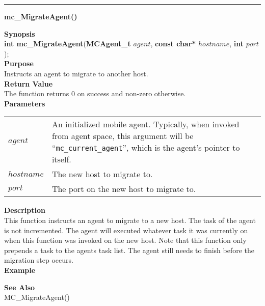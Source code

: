 \noindent
\vspace{5pt}
\rule{6.5in}{0.015in}
\noindent
{}
{\LARGE \bf mc\_MigrateAgent()}\\
\label{api:mc_MigrateAgent()}

\noindent
{\bf Synopsis}\\
{\bf int mc\_MigrateAgent}({\bf MCAgent\_t} $agent$, {\bf const char*} $hostname$, {\bf int} $port$);\\

\noindent
{\bf Purpose}\\
Instructs an agent to migrate to another host.\\

\noindent
{\bf Return Value}\\
The function returns 0 on success and non-zero otherwise.\\

\noindent
{\bf Parameters}
\vspace{-0.1in}
\begin{description}
\item
\begin{tabular}{p{15 mm}p{145 mm}} 
$agent$ & An initialized mobile agent. Typically, when invoked from agent space, this
  argument will be ``\texttt{mc\_current\_agent}'', which is the agent's pointer to itself.\\
$hostname$ & The new host to migrate to. \\
$port$ & The port on the new host to migrate to. \\
\end{tabular}
\end{description}

\noindent
{\bf Description}\\
This function instructs an agent to migrate to a new host. The task of the
agent is not incremented. The agent will executed whatever task it was
currently on when this function was invoked on the new host. Note that this
function only prepends a task to the agents task list. The agent still needs
to finish before the migration step occurs. \\

\noindent
{\bf Example}\\
\noindent
{\footnotesize}

\noindent
{\bf See Also}\\
MC\_MigrateAgent()

